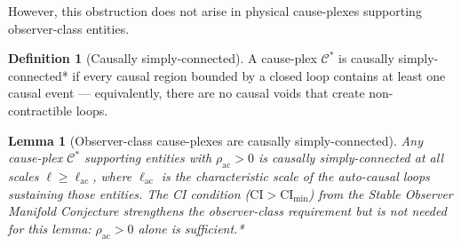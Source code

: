 \documentclass[11pt]{article}
\newtheorem{lemma}[theorem]{Lemma}
\theoremstyle{definition}
\newtheorem{definition}[theorem]{Definition}
\theoremstyle{remark}
\begin{document}
However, this obstruction does not arise in physical cause-plexes
supporting observer-class entities.

\begin{definition}[Causally simply-connected]
\label{definition:4-2}
A cause-plex $\mathcal{C}^{*}$ is causally simply-connected* if every causal region bounded by a closed loop contains at least one causal event — equivalently, there are no causal voids that create non-contractible loops.

\end{definition}

\begin{lemma}[Observer-class cause-plexes are causally simply-connected]
\label{lemma:4-3}
Any cause-plex $\mathcal{C}^{*}$ supporting entities with $\rho_{\mathrm{ac}} > 0$ is causally simply-connected at all scales $\ell \geq \ell_{\mathrm{ac}}$, where $\ell_{\mathrm{ac}}$ is the characteristic scale of the auto-causal loops sustaining those entities. The CI condition ($\mathrm{CI} > \mathrm{CI}_{\min}$) from the Stable Observer Manifold Conjecture strengthens the observer-class requirement but is not needed for this lemma: $\rho_{\mathrm{ac}} > 0$ alone is sufficient.*
\end{lemma}
\end{document}
